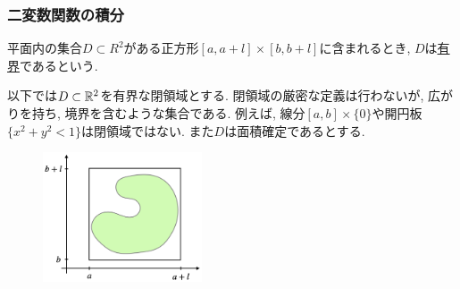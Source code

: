 



\begin{frame}
\frametitle{二変数関数の積分}


\begin{Def}
平面内の集合$D \subset R^2$がある正方形$[a,a+l]\times [b,b+l]$に含まれるとき, $D$は\underline{有界}であるという. 
\end{Def}

以下では$D\subset \mathbb{R}^2$を有界な閉領域とする. 
閉領域の厳密な定義は行わないが, 広がりを持ち, 境界を含むような集合である. 
例えば, 線分$[a,b] \times \{0\}$や開円板$\{x^2+y^2<1\}$は閉領域ではない. 
また$D$は面積確定であるとする. 
\vspace{-5mm}

\begin{figure}[htbp]
 \begin{center} 
  \includegraphics[width=47mm]{calculus13/bdd_domain.png}
 \end{center}
\end{figure}

\end{frame}





